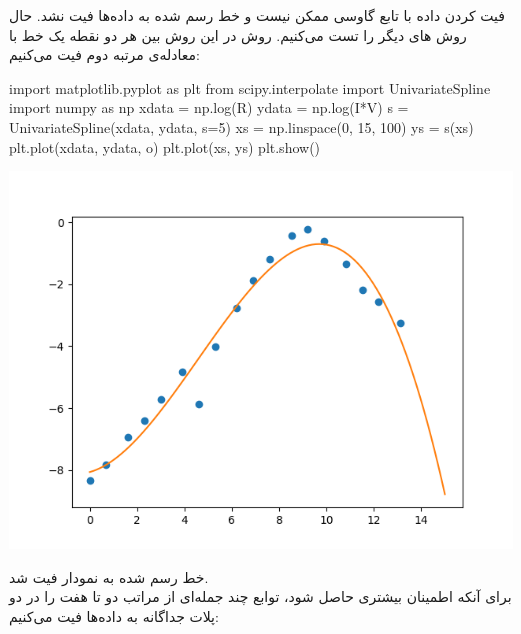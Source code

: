 \documentclass{article}
\newenvironment{Shaded}{}{}
\newcommand{\DecValTok}[1]{\textcolor[rgb]{0.25,0.63,0.44}{#1}}
\newcommand{\ImportTok}[1]{#1}
\newcommand{\NormalTok}[1]{#1}
\newcommand{\OperatorTok}[1]{\textcolor[rgb]{0.40,0.40,0.40}{#1}}
\newcommand{\StringTok}[1]{\textcolor[rgb]{0.25,0.44,0.63}{#1}}
\begin{document}
فیت کردن  داده با تابع گاوسی ممکن نیست و خط رسم شده به داده‌ها فیت نشد. حال روش های دیگر را تست می‌کنیم. روش  در این روش بین هر دو نقطه یک خط با معادله‌ی مرتبه دوم فیت می‌کنیم:
\begin{latin}
\begin{Shaded}
\begin{Highlighting}[]
\ImportTok{import}\NormalTok{ matplotlib.pyplot }\ImportTok{as}\NormalTok{ plt}
\ImportTok{from}\NormalTok{ scipy.interpolate }\ImportTok{import}\NormalTok{ UnivariateSpline}
\ImportTok{import}\NormalTok{ numpy }\ImportTok{as}\NormalTok{ np}
\NormalTok{xdata }\OperatorTok{=}\NormalTok{ np.log(R)}
\NormalTok{ydata }\OperatorTok{=}\NormalTok{ np.log(I}\OperatorTok{*}\NormalTok{V)}
\NormalTok{s }\OperatorTok{=}\NormalTok{ UnivariateSpline(xdata, ydata, s}\OperatorTok{=}\DecValTok{5}\NormalTok{)}
\NormalTok{xs }\OperatorTok{=}\NormalTok{ np.linspace(}\DecValTok{0}\NormalTok{, }\DecValTok{15}\NormalTok{, }\DecValTok{100}\NormalTok{)}
\NormalTok{ys }\OperatorTok{=}\NormalTok{ s(xs)}
\NormalTok{plt.plot(xdata, ydata, }\StringTok{\textquotesingle{}o\textquotesingle{}}\NormalTok{)}
\NormalTok{plt.plot(xs, ys)}
\NormalTok{plt.show()}
\end{Highlighting}
\end{Shaded}
\begin{center}
\includegraphics[scale=0.75]{Spline fit.png}
\end{center}
\end{latin}
خط رسم شده به نمودار فیت شد. \\
برای آنکه اطمینان بیشتری حاصل شود، توابع چند جمله‌ای از مراتب دو تا هفت را در دو پلات جداگانه به داده‌ها فیت می‌کنیم:
\end{document}
